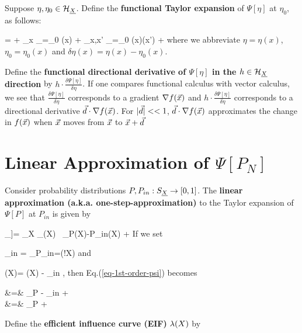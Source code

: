 Suppose $\eta, \eta_0\in {\cal H}_{\underline{X}}$. Define the
{\bf functional Taylor expansion} of $\Psi[\eta]$
at $\eta_0$, as follows:

\beq
\Psi[\eta]=
\Psi[\eta_0]
+ \sum_x
_{\eta=\eta_0}
\delta\eta(x)
+
\sum_{x,x'}
_{\eta=\eta_0}
\delta\eta(x)\delta\eta(x')
+
\cdots
\eeq
where we abbreviate
$ \eta =\eta(x)$,
$\eta_0=\eta_0(x)$ and $\delta \eta(x) = \eta(x)-\eta_0(x)$.



Define the
{\bf functional directional derivative of $\Psi[\eta]$ in
the $h\in {\cal H}_{\underline{X}}$
direction}
by $h\cdot\frac{\delta \Psi[\eta]}{\delta \eta}$.
If one compares functional calculus with vector calculus, we see that
$\frac{\delta \Psi[\eta]}{\delta \eta}$ corresponds to a gradient
$\nabla f({\vec{x}})$ and
$h\cdot \frac{\delta \Psi[\eta]}{\delta \eta}$
corresponds to a directional derivative
${\vec{d}}\cdot \nabla f({\vec{x}})$.
For $|{\vec{d}}|<<1$, ${\vec{d}}\cdot \nabla f({\vec{x}})$ approximates
the change
in $f({\vec{x}})$ when ${\vec{x}}$ moves from ${\vec{x}}$ to ${\vec{x}}+{\vec{d}}$


\section{Linear Approximation of $\Psi[P_N]$}



Consider probability
distributions $P, P_{in}:S_{\underline{X}}\rightarrow [0,1]$.
The {\bf linear approximation (a.k.a.
one-step-approximation)}
to the Taylor expansion of $\Psi[P]$ at
$P_{in}$ is given by

\beq
\underbrace{\Psi[P] - \Psi[P_{in}]}_{\delta \Psi[P,P_{in}]}]=
\sum_X
_{\dpsi[P_{in}](X)}
\
_{P(X)-P_{in}(X)}
+
\calr[P, P_{in}]
\label{eq-1st-order-psi}
\eeq
If we set

\beq
\dpsi_{in} = \av{\dpsi[P_{in}]}_{P_{in}}=\caln(!X)\in\RR
\eeq
and

\beq
\delta\dpsi[P](X)= \dpsi[P](X) - \dpsi_{in}
\;,
\eeq
then Eq.(\ref{eq-1st-order-psi}) becomes

\beqa
\delta\Psi[P,P_{in}]&=&
\av{\dpsi[P_{in}]}_P - \dpsi_{in}
+
\calr[P, P_{in}]
\\
&=&
\av{\delta\dpsi[P_{in}]}_P
+
\calr[P, P_{in}]
\eeqa

Define the {\bf efficient influence curve (EIF)} $\lambda(X)$ by

